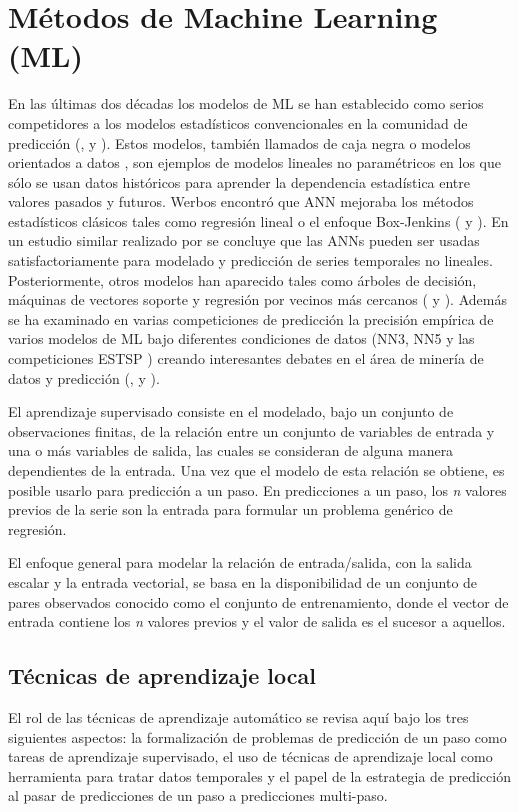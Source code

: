 \documentclass{llncs}
\begin{document}
\section{Métodos de Machine Learning (ML)}
En las últimas dos décadas los modelos de ML se han establecido como serios competidores a los modelos estadísticos convencionales en la comunidad de predicción (\cite{Ahmed2010594},\cite{Palit2005} y \cite{Zhang199835}). Estos modelos, también llamados de caja negra o modelos orientados a datos \cite{Mitchell1997}, son ejemplos de modelos lineales no paramétricos en los que sólo se usan datos históricos para aprender la dependencia estadística entre valores pasados y futuros. Werbos encontró que ANN mejoraba los métodos estadísticos clásicos tales como regresión lineal o el enfoque Box-Jenkins (\cite{Werbos1974} y \cite{Werbos1988339}). En un estudio similar realizado por \cite{Lapedes1987} se concluye que las ANNs pueden ser usadas satisfactoriamente para modelado y predicción de series temporales no lineales. Posteriormente, otros modelos han aparecido tales como árboles de decisión, máquinas de vectores soporte y regresión por vecinos más cercanos (\cite{Hastie2001} y \cite{Alpaydin2004}). Además se ha examinado en varias competiciones de predicción la precisión empírica de varios modelos de ML bajo diferentes condiciones de datos (NN3, NN5 y las competiciones ESTSP \cite{Crone2009456}\cite{Crone}\cite{Lendasse2007}) creando interesantes debates en el área de minería de datos y predicción (\cite{Hand2008}, \cite{Price2009452} y \cite{Crone2009456}).

El aprendizaje supervisado consiste en el modelado, bajo un conjunto de observaciones finitas, de la relación entre un conjunto de variables de entrada y una o más variables de salida, las cuales se consideran de alguna manera dependientes de la entrada. Una vez que el modelo de esta relación se obtiene, es posible usarlo para predicción a un paso. En predicciones a un paso, los \emph{n} valores previos de la serie son la entrada para formular un problema genérico de regresión. 

El enfoque general para modelar la relación de entrada/salida, con la salida escalar y la entrada vectorial, se basa en la disponibilidad de un conjunto de pares observados conocido como el conjunto de entrenamiento, donde el vector de entrada contiene los \emph{n} valores previos y el valor de salida es el sucesor a aquellos.

\subsection{Técnicas de aprendizaje local\\}
El rol de las técnicas de aprendizaje automático se revisa aquí bajo los tres siguientes aspectos: la formalización de problemas de predicción de un paso como tareas de aprendizaje supervisado, el uso de técnicas de aprendizaje local como herramienta para tratar datos temporales y el papel de la estrategia de predicción al pasar de predicciones de un paso a predicciones multi-paso. 
\end{document}
